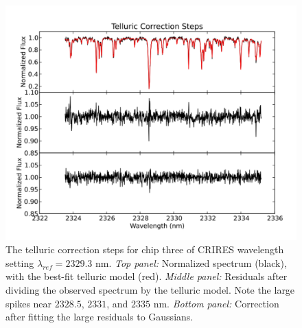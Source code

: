 \begin{figure}[t]
  \centering
  \includegraphics[width=\columnwidth]{Figures/paper1_fig3.pdf}
  \caption{The telluric correction steps for chip three of CRIRES
    wavelength setting $\lambda_{ref} = 2329.3$ nm. \emph{Top panel:}
    Normalized spectrum (black), with the best-fit telluric model
    (red). \emph{Middle panel:} Residuals after dividing the observed
    spectrum by the telluric model. Note the large spikes near
    $2328.5$, $2331$, and $2335$ nm. \emph{Bottom panel:} Correction
    after fitting the large residuals to Gaussians. }
  \label{correctionsteps}
\end{figure}



